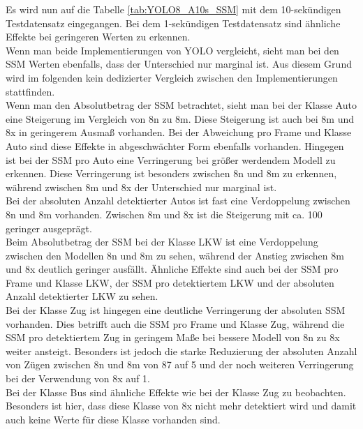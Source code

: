 {\begin{table}[h]
\begin{tabular}{l|l|l|l|l|l|l}
	\end{tabular}
	\end{table}
	Es wird nun auf die Tabelle \ref{tab:YOLO8_A10s_SSM} mit dem 10-sekündigen Testdatensatz eingegangen. Bei dem 1-sekündigen Testdatensatz sind ähnliche Effekte bei geringeren Werten zu erkennen. \\
	Wenn man beide Implementierungen von YOLO vergleicht, sieht man bei den SSM Werten ebenfalls, dass der Unterschied nur marginal ist. Aus diesem Grund wird im folgenden kein dedizierter Vergleich zwischen den Implementierungen stattfinden. \\
	Wenn man den Absolutbetrag der SSM betrachtet, sieht man bei der Klasse Auto eine Steigerung im Vergleich von 8n zu 8m. Diese Steigerung ist auch bei 8m und 8x in geringerem Ausmaß vorhanden. Bei der Abweichung pro Frame und Klasse Auto sind diese Effekte in abgeschwächter Form ebenfalls vorhanden. Hingegen ist bei der SSM pro Auto eine Verringerung bei größer werdendem Modell zu erkennen. Diese Verringerung ist besonders zwischen 8n und 8m zu erkennen, während zwischen 8m und 8x der Unterschied nur marginal ist. \\
	Bei der absoluten Anzahl detektierter Autos ist fast eine Verdoppelung zwischen 8n und 8m vorhanden. Zwischen 8m und 8x ist die Steigerung mit ca. 100 geringer ausgeprägt. \\
	Beim Absolutbetrag der SSM bei der Klasse LKW ist eine Verdoppelung zwischen den Modellen 8n und 8m zu sehen, während der Anstieg zwischen 8m und 8x deutlich geringer ausfällt. Ähnliche Effekte sind auch bei der SSM pro Frame und Klasse LKW, der SSM pro detektiertem LKW und der absoluten Anzahl detektierter LKW zu sehen. \\
	Bei der Klasse Zug ist hingegen eine deutliche Verringerung der absoluten SSM vorhanden. Dies betrifft auch die SSM pro Frame und Klasse Zug, während die SSM pro detektiertem Zug in geringem Maße bei bessere Modell von 8n zu 8x weiter ansteigt. Besonders ist jedoch die starke Reduzierung der absoluten Anzahl von Zügen zwischen 8n und 8m von 87 auf 5 und der noch weiteren Verringerung bei der Verwendung von 8x auf 1. \\
	Bei der Klasse Bus sind ähnliche Effekte wie bei der Klasse Zug zu beobachten. Besonders ist hier, dass diese Klasse von 8x nicht mehr detektiert wird und damit auch keine Werte für diese Klasse vorhanden sind.

}
